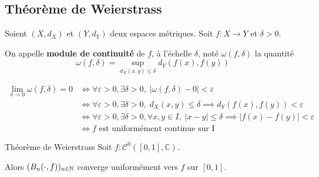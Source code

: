 \documentclass[a4paper,12pt]{article}
\begin{document}
\subsection{Théorème de Weierstrass}

\begin{definition}
    Soient $(X, d_X)$ et $(Y, d_Y)$ deux espaces métriques. Soit $f: X \to Y$ et $\delta > 0$.

    On appelle \textbf{module de continuité} de $f$, à l'échelle $\delta$, noté $\omega(f, \delta)$ la quantité
    $$
    \omega(f, \delta) = \sup_{d_X(x, y) \leq \delta} d_Y(f(x), f(y))
    $$
\end{definition}

\begin{remarque}
    \begin{align*}
        \lim_{\delta \to 0} \omega(f, \delta) = 0 &\iff \forall \varepsilon > 0, \exists \delta > 0, \; |\omega(f, \delta) - 0| < \varepsilon \\
        &\iff \forall \varepsilon > 0, \exists \delta > 0, \; d_X(x, y) \leq \delta \implies d_Y(f(x), f(y)) < \varepsilon \\
        &\iff \forall \varepsilon > 0, \exists \delta > 0, \forall x, y \in I, \; |x - y| \leq \delta \implies |f(x) - f(y)| < \varepsilon \\
        &\iff f \text{ est uniformément continue sur I}
    \end{align*}
\end{remarque}

\begin{theoreme}{Théorème de Weierstrass}{}
    Soit $f: \mathcal{C}^0([0, 1], \mathbb{C})$.
    
    Alors $(B_n(\cdot, f))_{n \in \mathbb{N}}$ converge uniformément vers $f$ sur $[0, 1]$.
\end{theoreme}
\end{document}
